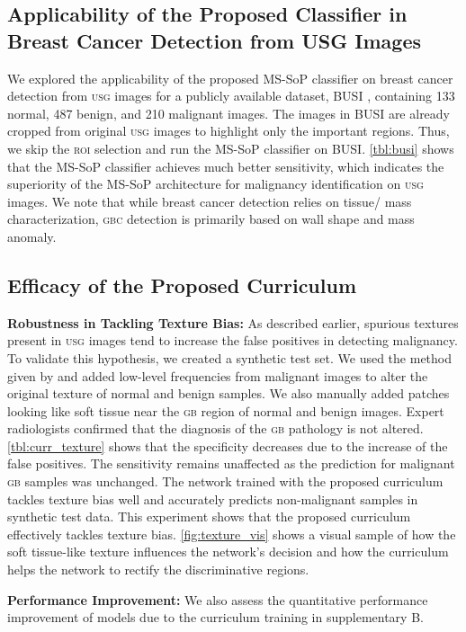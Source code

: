 \documentclass[10pt,twocolumn,letterpaper]{article}
\def\usg{\textsc{usg}\xspace}
\def\gbc{\textsc{gbc}\xspace}
\def\gb{\textsc{gb}\xspace}
\def\roi{\textsc{roi}\xspace}
\newcommand{\myfirstpara}[1]{\noindent \textbf{#1:}}
\newcommand{\mypara}[1]{\vspace{0.1em} \myfirstpara{#1}}
\begin{document}
\subsection{Applicability of the Proposed Classifier in Breast Cancer Detection from USG Images}
We explored the applicability of the proposed MS-SoP classifier on breast cancer detection from \usg images for a publicly available dataset, BUSI \cite{al2020dataset}, containing 133 normal, 487 benign, and 210 malignant images. The images in BUSI are already cropped from original \usg images to highlight only the important regions. Thus, we skip the \roi selection and run the MS-SoP classifier on BUSI. \cref{tbl:busi} shows that the MS-SoP classifier achieves much better sensitivity, which indicates the superiority of the MS-SoP architecture for malignancy identification on \usg images. We note that while breast cancer detection relies on tissue/ mass characterization, \gbc detection is primarily based on wall shape and mass anomaly. 

\subsection{Efficacy of the Proposed Curriculum}
\myfirstpara{Robustness in Tackling Texture Bias}
As described earlier, spurious textures present in \usg images tend to increase the false positives in detecting malignancy. To validate this hypothesis, we created a synthetic test set. We used the method given by \cite{yang2020fda} and added low-level frequencies from malignant images to alter the original texture of normal and benign samples. We also manually added patches looking like soft tissue near the \gb region of normal and benign images. Expert radiologists confirmed that the diagnosis of the \gb pathology is not altered. \cref{tbl:curr_texture} shows that the specificity decreases due to the increase of the false positives. The sensitivity remains unaffected as the prediction for malignant \gb samples was unchanged. The network trained with the proposed curriculum tackles texture bias well and accurately predicts non-malignant samples in synthetic test data. This experiment shows that the proposed curriculum effectively tackles texture bias. \cref{fig:texture_vis} shows a visual sample of how the soft tissue-like texture influences the network's decision and how the curriculum helps the network to rectify the discriminative regions. 

\mypara{Performance Improvement} 
We also assess the quantitative performance improvement of models due to the curriculum training in supplementary B. 
\end{document}
